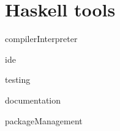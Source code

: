\section{Haskell tools}

{compilerInterpreter}

{ide}

{testing}

{documentation}

{packageManagement}
